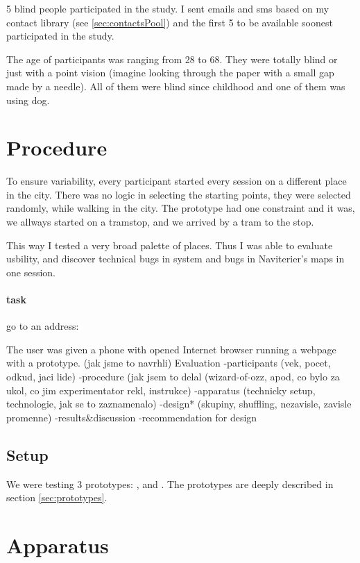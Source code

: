 	5 blind people participated in the study. I sent emails and sms based on my contact library (see \ref{sec:contactsPool}) and the first 5 to be available soonest participated in the study. 
	
	The age of participants was ranging from 28 to 68.
	They were totally blind or just with a point vision (imagine looking through the paper with a small gap made by a needle).
	All of them were blind since childhood and one of them was using dog.
	\section{Procedure}
	To ensure variability, every participant started every session on a different place in the city. There was no logic in selecting the starting points, they were selected randomly, while walking in the city. The \poi prototype had one constraint and it was, we allways started on a tramstop, and we arrived by a tram to the stop.
	
	
	This way I tested a very broad palette of places. Thus I was able to evaluate usbility, and discover technical bugs in system and bugs in Naviterier's maps\cite{naviterier-maps} in one session.
	
	
	\paragraph{task}
	go to an address: 
	
	The user was given a phone with opened Internet browser running a webpage with a prototype. 
	(jak jsme to navrhli)
	Evaluation
	-participants (vek, pocet, odkud, jaci lide)
	-procedure (jak jsem to delal (wizard-of-ozz, apod, co bylo za ukol, co jim experimentator rekl, instrukce)
	-apparatus (technicky setup, technologie, jak se to zaznamenalo)
	-design* (skupiny, shuffling, nezavisle, zavisle promenne)
	-results\&discussion
	-recommendation for design
	
	\subsection{Setup}
	We were testing 3 prototypes: \poi{}, \reversegeo{} and \gps{}. The prototypes are deeply described in section \ref{sec:prototypes}. 
	\subsection{}
	\section{Apparatus}
